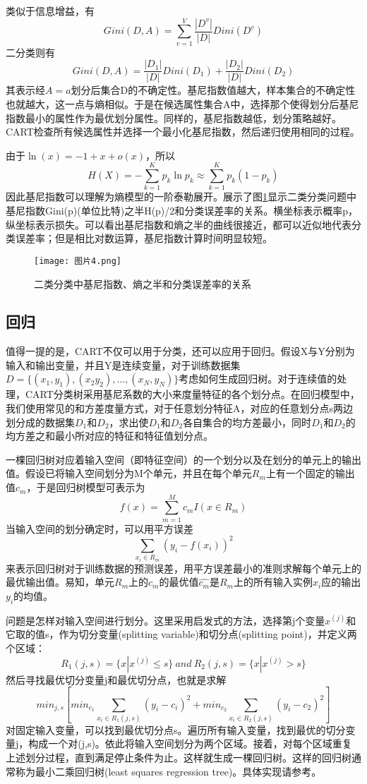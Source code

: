 \documentclass[fontset=windows]{article}
\begin{document}
类似于信息增益，有$$Gini(D,A)=\sum_{v=1}^{V}\frac{|D^v|}{|D|}Dini(D^v)$$二分类则有$$Gini(D,A)=\frac{|D_1|}{|D|}Dini(D_1)+\frac{|D_2|}{|D|}Dini(D_2)$$其表示经$A=a$划分后集合D的不确定性。基尼指数值越大，样本集合的不确定性也就越大，这一点与熵相似。于是在候选属性集合A中，选择那个使得划分后基尼指数最小的属性作为最优划分属性。同样的，基尼指数越低，划分策略越好。CART检查所有候选属性并选择一个最小化基尼指数，然后递归使用相同的过程。

由于$\ln(x)=-1+x+o(x)$，所以$$H(X)=-\sum_{k=1}^{K}p_k\ln{p_k}\approx \sum_{k=1}^{K}p_k(1-p_k)$$因此基尼指数可以理解为熵模型的一阶泰勒展开。\cite[统计与学习方法]{ref4}展示了图\ref{fig:4}显示二类分类问题中基尼指数Gini(p)(单位比特)之半H(p)/2和分类误差率的关系。横坐标表示概率p，纵坐标表示损失。可以看出基尼指数和熵之半的曲线很接近，都可以近似地代表分类误差率；但是相比对数运算，基尼指数计算时间明显较短。

\begin{figure}[h]
\centering
\texttt{[image: 图片4.png]}
\caption{\label{fig:4}二类分类中基尼指数、熵之半和分类误差率的关系}
\end{figure}

\subsection{回归}

值得一提的是，CART不仅可以用于分类，还可以应用于回归。假设X与Y分别为输入和输出变量，并且Y是连续变量，对于训练数据集$D=\{(x_1,y_1),(x_2y_2),\dots,(x_N,y_N)\}$考虑如何生成回归树。对于连续值的处理，CART分类树采用基尼系数的大小来度量特征的各个划分点。在回归模型中，我们使用常见的和方差度量方式，对于任意划分特征A，对应的任意划分点s两边划分成的数据集$D_1$和$D_2$，求出使$D_1$和$D_2$各自集合的均方差最小，同时$D_1$和$D_2$的均方差之和最小所对应的特征和特征值划分点。

一棵回归树对应着输入空间（即特征空间）的一个划分以及在划分的单元上的输出值。假设已将输入空间划分为M个单元，并且在每个单元$R_m$上有一个固定的输出值$c_m$，于是回归树模型可表示为$$f(x)=\sum_{m=1}^{M}c_mI(x\in R_m)$$当输入空间的划分确定时，可以用平方误差$$\sum_{x_i\in R_m}(y_i-f(x_i))^2$$来表示回归树对于训练数据的预测误差，用平方误差最小的准则求解每个单元上的最优输出值。易知，单元$R_m$上的$c_m$的最优值$\hat{c_m}$是$R_m$上的所有输入实例$x_i$应的输出$y_i$的均值。

问题是怎样对输入空间进行划分。这里采用启发式的方法，选择第j个变量$x^{(j)}$和它取的值s，作为切分变量(splitting variable)和切分点(splitting point)，并定义两个区域：$$R_1(j,s)=\{x|x^{(j)}\leq s\}\ and\ R_2(j,s)=\{x|x^{(j)}>s\}$$然后寻找最优切分变量j和最优切分点，也就是求解$$min_{j,s}\left[min_{c_1}\sum_{x_i\in R_1(j,s)}(y_i-c_i)^2+min_{c_2}\sum_{x_i\in R_2(j,s)}(y_i-c_2)^2\right]$$对固定输入变量，可以找到最优切分点s。遍历所有输入变量，找到最优的切分变量j，构成一个对(j,s)。依此将输入空间划分为两个区域。接着，对每个区域重复上述划分过程，直到满足停止条件为止。这样就生成一棵回归树。这样的回归树通常称为最小二乘回归树(least squares regression tree)。具体实现请参考\cite[统计学习方法]{ref4}。
\end{document}

